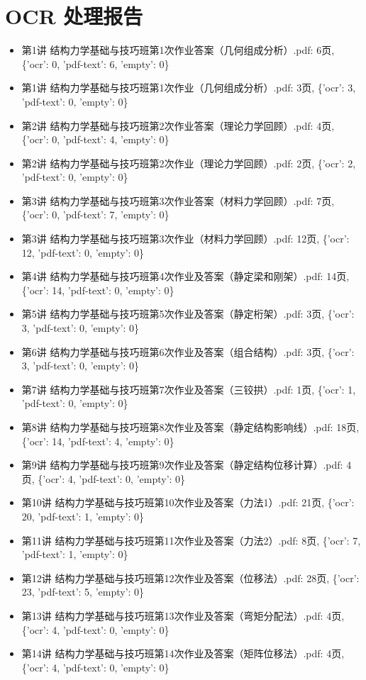 \documentclass[UTF8,12pt,a4paper,openany]{ctexbook}
\begin{document}
\chapter*{OCR 处理报告}
\begin{itemize}
\item 第1讲 结构力学基础与技巧班第1次作业答案（几何组成分析）.pdf: 6页, \{'ocr': 0, 'pdf-text': 6, 'empty': 0\}
\item 第1讲 结构力学基础与技巧班第1次作业（几何组成分析）.pdf: 3页, \{'ocr': 3, 'pdf-text': 0, 'empty': 0\}
\item 第2讲 结构力学基础与技巧班第2次作业答案（理论力学回顾）.pdf: 4页, \{'ocr': 0, 'pdf-text': 4, 'empty': 0\}
\item 第2讲 结构力学基础与技巧班第2次作业（理论力学回顾）.pdf: 2页, \{'ocr': 2, 'pdf-text': 0, 'empty': 0\}
\item 第3讲 结构力学基础与技巧班第3次作业答案（材料力学回顾）.pdf: 7页, \{'ocr': 0, 'pdf-text': 7, 'empty': 0\}
\item 第3讲 结构力学基础与技巧班第3次作业（材料力学回顾）.pdf: 12页, \{'ocr': 12, 'pdf-text': 0, 'empty': 0\}
\item 第4讲 结构力学基础与技巧班第4次作业及答案（静定梁和刚架）.pdf: 14页, \{'ocr': 14, 'pdf-text': 0, 'empty': 0\}
\item 第5讲 结构力学基础与技巧班第5次作业及答案（静定桁架）.pdf: 3页, \{'ocr': 3, 'pdf-text': 0, 'empty': 0\}
\item 第6讲 结构力学基础与技巧班第6次作业及答案（组合结构）.pdf: 3页, \{'ocr': 3, 'pdf-text': 0, 'empty': 0\}
\item 第7讲 结构力学基础与技巧班第7次作业及答案（三铰拱）.pdf: 1页, \{'ocr': 1, 'pdf-text': 0, 'empty': 0\}
\item 第8讲 结构力学基础与技巧班第8次作业及答案（静定结构影响线）.pdf: 18页, \{'ocr': 14, 'pdf-text': 4, 'empty': 0\}
\item 第9讲 结构力学基础与技巧班第9次作业及答案（静定结构位移计算）.pdf: 4页, \{'ocr': 4, 'pdf-text': 0, 'empty': 0\}
\item 第10讲 结构力学基础与技巧班第10次作业及答案（力法1）.pdf: 21页, \{'ocr': 20, 'pdf-text': 1, 'empty': 0\}
\item 第11讲 结构力学基础与技巧班第11次作业及答案（力法2）.pdf: 8页, \{'ocr': 7, 'pdf-text': 1, 'empty': 0\}
\item 第12讲 结构力学基础与技巧班第12次作业及答案（位移法）.pdf: 28页, \{'ocr': 23, 'pdf-text': 5, 'empty': 0\}
\item 第13讲 结构力学基础与技巧班第13次作业及答案（弯矩分配法）.pdf: 4页, \{'ocr': 4, 'pdf-text': 0, 'empty': 0\}
\item 第14讲 结构力学基础与技巧班第14次作业及答案（矩阵位移法）.pdf: 4页, \{'ocr': 4, 'pdf-text': 0, 'empty': 0\}
\end{itemize}
\end{document}
